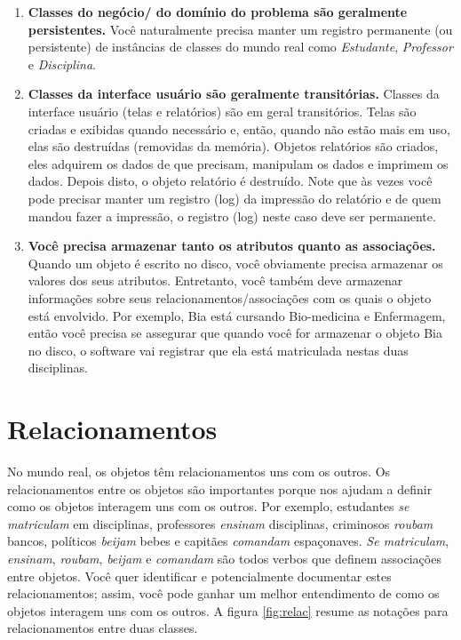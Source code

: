 \documentclass[
	11pt,				%
	openright,
	twoside,			%
	a4paper,			%
	english,			%
	french,
	brazil,				%
	sumario=tradicional
	]{abntex2}
\begin{document}
\begin{enumerate}
\item \textbf{Classes do negócio/ do domínio do problema são geralmente persistentes.} Você  naturalmente precisa manter um registro permanente (ou persistente) de instâncias de classes do mundo real como \emph{Estudante}, \emph{Professor} e \emph{Disciplina}.

\item \textbf{Classes da interface usuário são geralmente transitórias.} Classes da interface usuário (telas e relatórios) são em geral transitórios. Telas são criadas e exibidas quando necessário e, então, quando não estão mais em uso, elas são destruídas (removidas da memória). Objetos relatórios são criados, eles adquirem os dados de que precisam, manipulam os dados e imprimem os dados. Depois disto, o objeto relatório é destruído. Note que às vezes você pode precisar manter um registro (log) da impressão do relatório e de quem mandou fazer a impressão, o registro (log) neste caso deve ser permanente.

\item \textbf{Você precisa armazenar tanto os atributos quanto as associações.}
Quando um objeto é escrito no disco, você obviamente precisa armazenar os valores dos seus atributos. Entretanto, você também deve armazenar informações sobre seus relacionamentos/associações com os quais o objeto está envolvido. Por exemplo, Bia está cursando Bio-medicina e Enfermagem, então você precisa se assegurar que quando você for armazenar o objeto Bia no disco, o software vai registrar que ela está matriculada nestas duas disciplinas.
\end{enumerate}

\section{Relacionamentos}

No mundo real, os objetos têm relacionamentos uns com os outros. Os relacionamentos entre os objetos são importantes porque nos ajudam a definir como os objetos interagem uns com os outros. Por exemplo, estudantes \textit{se matriculam} em disciplinas, professores \textit{ensinam} disciplinas, criminosos \textit{roubam} bancos, políticos \textit{beijam} bebes e capitães \textit{comandam} espaçonaves. \textit{Se matriculam}, \textit{ensinam}, \textit{roubam}, \textit{beijam} e \textit{comandam} são todos verbos que definem associações entre objetos. Você quer identificar e potencialmente documentar estes relacionamentos; assim, você pode ganhar um melhor entendimento de como os objetos interagem uns com os outros. A figura \ref{fig:relac} resume as notações para relacionamentos entre duas classes.
\end{document}

